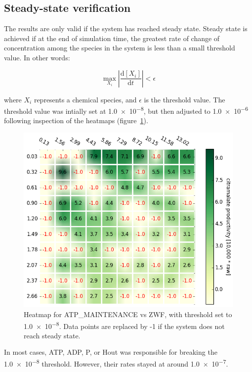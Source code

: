 \documentclass[parskip=full, numbers=noenddot]{scrreprt}
\begin{document}
\subsection{Steady-state verification}
\label{ssec:steadystate}

The results are only valid if the system has reached steady state. Steady state is achieved if at the end of simulation time, the greatest rate of change of concentration among the species in the system is less than a small threshold value. In other words:

\begin{equation}
  \max_{X_{i}} \left | \frac{\mathrm{d}[X_{i}]}{\mathrm{d}t} \right | < \epsilon
\end{equation}
\label{eqn:steadystate}

where $X_{i}$ represents a chemical species, and $\epsilon$ is the threshold value. The threshold value was intially set at \num{1.0e-8}, but then adjusted to \num{1.0e-6} following inspection of the heatmaps (figure~\ref{fig:steadystate}).

\begin{figure}[hbp]
  \centering
  \includegraphics[scale=0.5]{steadystate}
  \caption{Heatmap for ATP\_MAINTENANCE vs ZWF, with threshold set to \num{1.0e-8}. Data points are replaced by -1 if the system does not reach steady state.}
  \label{fig:steadystate}
\end{figure}

In most cases, ATP, ADP, P, or Hout was responsible for breaking the \num{1.0e-8} threshold. However, their rates stayed at around \num{1.0e-7}.
\end{document}
